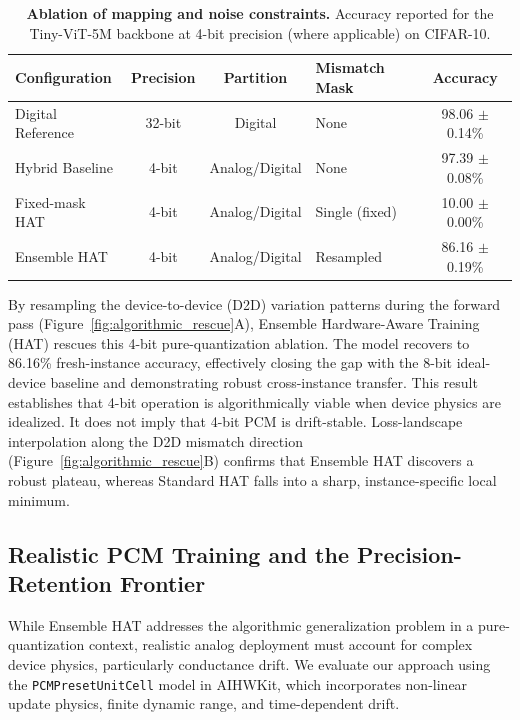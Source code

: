 \begin{table}[htbp]
\centering
\caption{\textbf{Ablation of mapping and noise constraints.} Accuracy reported for the Tiny-ViT-5M backbone at 4-bit precision (where applicable) on CIFAR-10.}
\label{tab:ablation_mapping}
\begin{tabular}{lcclc}
\toprule
\textbf{Configuration} & \textbf{Precision} & \textbf{Partition} & \textbf{Mismatch Mask} & \textbf{Accuracy} \\
\midrule
Digital Reference & 32-bit & Digital & None & 98.06 $\pm$ 0.14\% \\
Hybrid Baseline & 4-bit & Analog/Digital & None & 97.39 $\pm$ 0.08\% \\
Fixed-mask HAT & 4-bit & Analog/Digital & Single (fixed) & 10.00 $\pm$ 0.00\% \\
Ensemble HAT & 4-bit & Analog/Digital & Resampled & 86.16 $\pm$ 0.19\% \\
\bottomrule
\end{tabular}
\end{table}

By resampling the device-to-device (D2D) variation patterns during the forward pass (Figure~\ref{fig:algorithmic_rescue}A), Ensemble Hardware-Aware Training (HAT) rescues this 4-bit pure-quantization ablation. The model recovers to 86.16\% fresh-instance accuracy, effectively closing the gap with the 8-bit ideal-device baseline and demonstrating robust cross-instance transfer. This result establishes that 4-bit operation is algorithmically viable when device physics are idealized. It does not imply that 4-bit PCM is drift-stable. Loss-landscape interpolation along the D2D mismatch direction (Figure~\ref{fig:algorithmic_rescue}B) confirms that Ensemble HAT discovers a robust plateau, whereas Standard HAT falls into a sharp, instance-specific local minimum.

\subsection{Realistic PCM Training and the Precision-Retention Frontier}
\label{subsec:pcm-precision-ladder}

While Ensemble HAT addresses the algorithmic generalization problem in a pure-quantization context, realistic analog deployment must account for complex device physics, particularly conductance drift. We evaluate our approach using the \texttt{PCMPresetUnitCell} model in AIHWKit, which incorporates non-linear update physics, finite dynamic range, and time-dependent drift.

